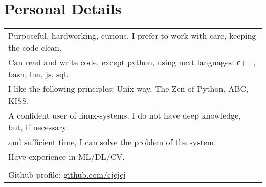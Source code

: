 \documentclass[a4paper,10pt]{article}
\begin{document}
\section{Personal Details}
\begin{tabularx}{\textwidth}{l} %
Purposeful, hardworking, curious. I prefer to work with care, keeping the code clean. \\
Can read and write code, except python, using next languages: с++, bash, lua, js, sql. \\
I like the following principles: Unix way, The Zen of Python, ABC, KISS. \\
A confident user of linux-systems. I do not have deep knowledge, but, if necessary\\and sufficient time, I can solve the problem of the system. \\
Have experience in ML/DL/CV. \\
\\
Github profile: \href{https://github.com/cjcjcj}{github.com/cjcjcj} 
\end{tabularx}
\end{document}
